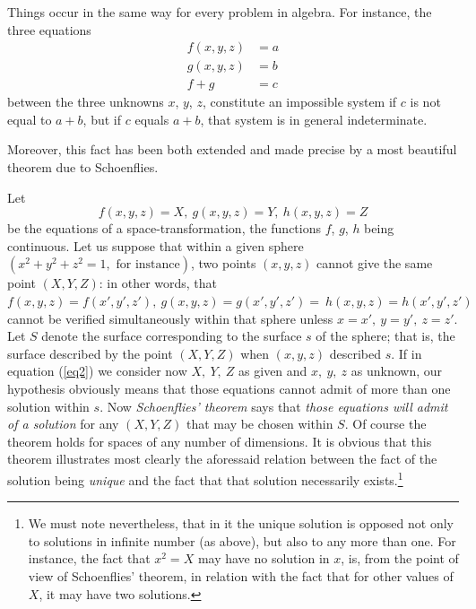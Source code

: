 \documentclass[12pt,oneside]{book}
\begin{document}
Things occur in the same way for every problem in algebra. For instance, the three equations 
\begin{align*}
    f(x,y,z)&=a \\
    g(x,y,z)&=b \\
    f+g&=c
\end{align*}
between the three unknowns $x$, $y$, $z$, constitute an impossible system if $c$ is not equal to $a+b$, but if 
$c$ equals $a+b$, that system is in general indeterminate. \par 

Moreover, this fact has been both extended and made precise by a most beautiful theorem due to Schoenflies. \par 

Let
\begin{equation}
    \label{eq2}
    f(x,y,z)=X, \ g(x,y,z)=Y, \ h(x,y,z)=Z
\end{equation}
be the equations of a space-transformation, the functions $f$, $g$, $h$ being continuous. Let us suppose that within a given sphere $(x^2+y^2+z^2=1,\text{ for instance})$, two points $(x,y,z)$ cannot give the same point $(X,Y,Z)$: in other words, that $f(x,y,z)=f(x',y',z'),\ g(x,y,z)=g(x',y',z')=\ h(x,y,z)=h(x',y',z')$ cannot be verified simultaneously within that sphere unless $x=x',\ y=y',\ z=z'$. Let $S$ denote the surface corresponding to the surface $s$ of the sphere; that is, the surface described by the point $(X,Y,Z)$ when $(x,y,z)$ described $s$. If in equation (\ref{eq2}) we consider now $X,\ Y,\ Z$ as given and $x,\ y,\ z$ as unknown, our hypothesis obviously means that those equations cannot admit of more than one solution within $s$. Now \textit{Schoenflies' theorem} says that \textit{those equations will admit of a solution} for any $(X,Y,Z)$ that may be chosen within $S$. Of course the theorem holds for spaces of any number of dimensions. It is obvious that this theorem illustrates most clearly the aforessaid relation between the fact of the solution being \textit{unique} and the fact that that solution necessarily exists.\footnote{We must note nevertheless, that in it the unique solution is opposed not only to solutions in infinite number (as above), but also to any more than one. For instance, the fact that $x^2=X$ may have no solution in $x$, is, from the point of view of Schoenflies' theorem, in relation with the fact that for other values of $X$, it may have two solutions.} \par 
\end{document}
